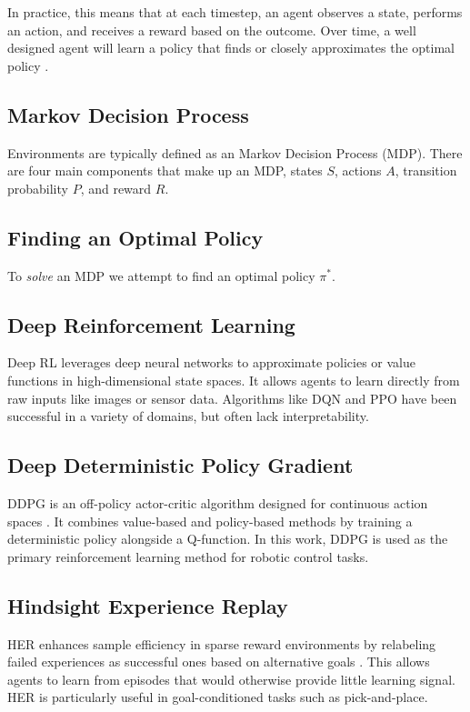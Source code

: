 In practice, this means that at each timestep, an agent observes a state, performs an action, and receives a reward based on the outcome.
Over time, a well designed agent will learn a policy that finds or closely approximates the optimal policy \cite{Sutton1998}.

\subsection{Markov Decision Process}
Environments are typically defined as an Markov Decision Process (MDP). There are four main components that make up an MDP, states $S$, actions $A$, transition probability $P$, and reward $R$.


\subsection{Finding an Optimal Policy}
To \textit{solve} an MDP we attempt to find an optimal policy $\pi^*$.

\subsection{Deep Reinforcement Learning} \label{ss:deep_reinforcement_learning}
Deep RL leverages deep neural networks to approximate policies or value functions in high-dimensional state spaces. It allows agents to learn directly from raw inputs like images or sensor data. Algorithms like DQN and PPO have been successful in a variety of domains, but often lack interpretability.

\subsection{Deep Deterministic Policy Gradient} \label{ss:deep_deterministic_policy_gradient}
DDPG is an off-policy actor-critic algorithm designed for continuous action spaces \cite{lillicrap2019continuouscontroldeepreinforcement}. It combines value-based and policy-based methods by training a deterministic policy alongside a Q-function. In this work, DDPG is used as the primary reinforcement learning method for robotic control tasks.

\subsection{Hindsight Experience Replay} \label{ss:hindsight_experience_replay}
HER enhances sample efficiency in sparse reward environments by relabeling failed experiences as successful ones based on alternative goals \cite{andrychowicz2018hindsightexperiencereplay}. This allows agents to learn from episodes that would otherwise provide little learning signal. HER is particularly useful in goal-conditioned tasks such as pick-and-place.

